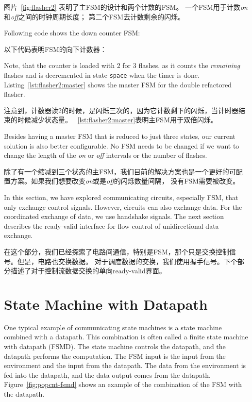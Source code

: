 \documentclass[%
    10pt,
    headinclude, footexclude,
    openright, %
    notitlepage,
    cleardoubleempty,
    headsepline,
    pointlessnumbers,
    bibtotoc, idxtotoc,
    ]{scrbook}
\newcommand{\code}[1]{{\small{\texttt{#1}}}}
\begin{document}
图片~\ref{fig:flasher2} 表明了主FSM的设计和两个计数的FSM。
一个FSM用于计数\emph{on}和\emph{off}之间的时钟周期长度；
第二个FSM去计数剩余的闪烁。

Following code shows the down counter FSM:

以下代码表明FSM的向下计数器：


\noindent Note, that the counter is loaded with 2 for 3 flashes, as it counts the
\emph{remaining} flashes and is decremented in state \code{space} when the timer
is done. Listing~\ref{lst:flasher2:master} shows the master FSM for the double refactored flasher.

\noindent 注意到，计数器读2的时候，是闪烁三次的，因为它计数剩下的闪烁，当计时器结束的时候减少状态量。
~\ref{lst:flasher2:master}表明主FSM用于双倍闪烁。


Besides having a master FSM that is reduced to just three states, our current solution
is also better configurable. No FSM needs to be changed if we want to change
the length of the \emph{on} or \emph{off} intervals or the number of flashes.

除了有一个缩减到三个状态的主FSM，我们目前的解决方案也是一个更好的可配置方案。如果我们想要改变\emph{on}或是\emph{off}的闪烁数量间隔，
没有FSM需要被改变。

In this section, we have explored communicating circuits, especially FSM, that
only exchange control signals. However, circuits can also exchange data.
For the coordinated exchange of data, we use handshake signals.
The next section describes the ready-valid interface for flow control of
unidirectional data exchange.

在这个部分，我们已经探索了电路间通信，特别是FSM，那个只是交换控制信号。但是，电路也交换数据。
对于调度数据的交换，我们使用握手信号。下个部分描述了对于控制流数据交换的单向ready-valid界面。

\section{State Machine with Datapath}

One typical example of communicating state machines is a state machine
combined with a datapath. This combination is often called a finite state machine
with datapath (FSMD). The state machine controls the datapath, and the datapath
performs the computation. The FSM input is the input from the environment and the input
from the datapath. The data from the environment is fed into the datapath, and the
data output comes from the datapath. Figure~\ref{fig:popcnt-fsmd} shows an example
of the combination of the FSM with the datapath.
\end{document}
